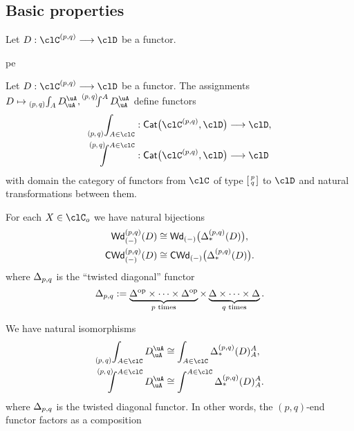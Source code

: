\documentclass[11pt]{amsart}
\begin{document}
\subsection{Basic properties}
\begin{proposition}\label{prop:properties-of-p-q-ends}
	Let $D :\pq{\clC}\longrightarrow\clD$ be a functor.
	\begin{enumtag}{pe}
		\item\label{functoriality-of-p-q-ends}Let $D :\pq{\clC}\longrightarrow\clD$ be a functor. The assignments $D\mapsto\pqEnd{p}{q}{A}D^{\uA}_{\!\uA},\pqCoend{p}{q}{A}D^{\uA}_{\!\uA}$ define functors
		\begin{align*}
			\pqEnd{p}{q}{A\in\clC}   & : \Cat\big(\pq{\clC},\clD\big) \longrightarrow\clD, \\
			\pqCoend{p}{q}{A\in\clC} & : \Cat\big(\pq{\clC},\clD\big) \longrightarrow\clD
		\end{align*}
		with domain the category of functors from $\clC$ of type $\left[\pqMat{p\\q}\right]$ to $\clD$ and natural transformations between them.
		\item\label{p-q-wedges-and-p-q-diagonals}For each $X\in\clC_o$ we have natural bijections
		\begin{align*}
			\mathsf{Wd}^{(p,q)}_{(-)}(D)   & \cong   \mathsf{Wd}_{(-)}\big(\Delta^{(p,q)}_{*}(D)\big), \\
			\mathsf{CWd}^{(p,q)}_{(-)}(D) & \cong \mathsf{CWd}_{(-)}\big(\Delta^{(p,q)}_{*}(D)\big).
		\end{align*}
		where $\Delta_{p,q}$ is the ``twisted diagonal'' functor%
		\[\Delta_{p,q}:=\underbrace{\Delta^{\mathrm{op}}\times\cdots\times\Delta^{\mathrm{op}}}_{\text{$p$ times}}\times\underbrace{\Delta\times\cdots\times\Delta}_{\text{$q$ times}}.\]
		\item\label{p-q-ends-as-ordinary-ends}We have natural isomorphisms
		\begin{align*}
			\pqEnd{p}{q}{A\in\clC}D^{\uA}_{\!\uA}   & \cong \int_{A\in\clC}\Delta^{(p,q)}_{*}(D)^{A}_{A}, \\
			\pqCoend{p}{q}{A\in\clC}D^{\uA}_{\!\uA} & \cong \int^{A\in\clC}\Delta^{(p,q)}_{*}(D)^{A}_{A}.
		\end{align*}
		where $\Delta_{p,q}$ is the twisted diagonal functor.%
		In other words, the $(p,q)$-end functor factors as a composition

\end{enumtag}
\end{proposition}
\end{document}
